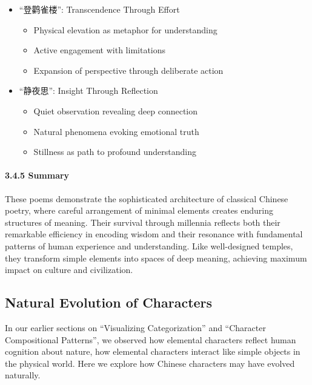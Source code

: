 \begin{itemize}
\tightlist
\item
  ``登鹳雀楼'': Transcendence Through Effort

  \begin{itemize}
  \tightlist
  \item
    Physical elevation as metaphor for understanding
  \item
    Active engagement with limitations
  \item
    Expansion of perspective through deliberate action
  \end{itemize}
\item
  ``静夜思'': Insight Through Reflection

  \begin{itemize}
  \tightlist
  \item
    Quiet observation revealing deep connection
  \item
    Natural phenomena evoking emotional truth
  \item
    Stillness as path to profound understanding
  \end{itemize}
\end{itemize}

\hypertarget{summary}{%
\paragraph{3.4.5 Summary}\label{summary}}

These poems demonstrate the sophisticated architecture of classical
Chinese poetry, where careful arrangement of minimal elements creates
enduring structures of meaning. Their survival through millennia
reflects both their remarkable efficiency in encoding wisdom and their
resonance with fundamental patterns of human experience and
understanding. Like well-designed temples, they transform simple
elements into spaces of deep meaning, achieving maximum impact on
culture and civilization.

\hypertarget{natural-evolution-of-characters}{%
\subsection{Natural Evolution of
Characters}\label{natural-evolution-of-characters}}

In our earlier sections on ``Visualizing Categorization'' and
``Character Compositional Patterns'', we observed how elemental
characters reflect human cognition about nature, how elemental
characters interact like simple objects in the physical world. Here we
explore how Chinese characters may have evolved naturally.

